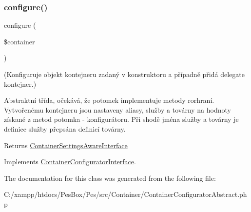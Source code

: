 \subsubsection{\texorpdfstring{configure()}{configure()}}
{\footnotesize\ttfamily configure (\begin{DoxyParamCaption}\item[{\mbox{\hyperlink{interface_pes_1_1_container_1_1_container_settings_aware_interface}{Container\+Settings\+Aware\+Interface}}}]{\$container }\end{DoxyParamCaption})}

(Konfiguruje objekt kontejneru zadaný v konstruktoru a případně přidá delegate kontejner.)

Abstraktní třída, očekává, že potomek implementuje metody rorhraní. Vytvořenému kontejneru jsou nastaveny aliasy, služby a továrny na hodnoty získané z metod potomka -\/ konfigurátoru. Při shodě jména služby a továrny je definice služby přepsána definicí továrny.

\begin{DoxyReturn}{Returns}
\mbox{\hyperlink{interface_pes_1_1_container_1_1_container_settings_aware_interface}{Container\+Settings\+Aware\+Interface}} 
\end{DoxyReturn}


Implements \mbox{\hyperlink{interface_pes_1_1_container_1_1_container_configurator_interface_aa010017c090252363602d277501f61f4}{Container\+Configurator\+Interface}}.



The documentation for this class was generated from the following file\+:\begin{DoxyCompactItemize}
\item 
C\+:/xampp/htdocs/\+Pes\+Box/\+Pes/src/\+Container/Container\+Configurator\+Abstract.\+php\end{DoxyCompactItemize}
